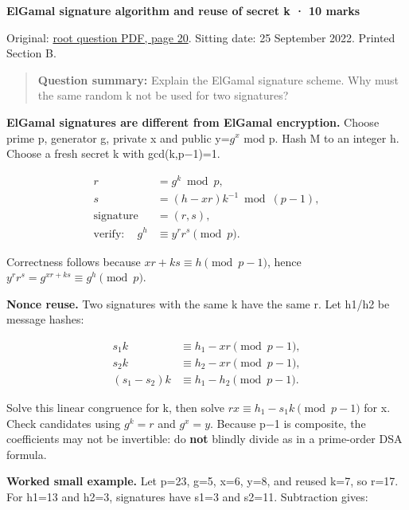 \documentclass[11pt,a4paper]{article}
\begin{document}
\textbf{ElGamal signature algorithm and reuse of secret k · 10 marks}


Original: \href{../../CSE405-Security_Merged.pdf\#page=20}{root question PDF,\allowbreak{} page 20}. Sitting date: 25 September 2022. Printed Section B.



\begin{quote}\small

\textbf{Question summary:} Explain the ElGamal signature scheme. Why must the same random k not be used for two signatures?



\end{quote}

\textbf{ElGamal signatures are different from ElGamal encryption.} Choose prime p,\allowbreak{} generator g,\allowbreak{} private x and public y=\allowbreak{}\(g^{x}\) mod p. Hash M to an integer h. Choose a fresh secret k with gcd(k,\allowbreak{}p−1)=\allowbreak{}1.



\[
\begin{aligned}r&=g^k\bmod p,\\s&=(h-xr)k^{-1}\bmod(p-1),\\\mathrm{signature}&=(r,s),\\\mathrm{verify:}\quad g^h&\equiv y^r r^s\pmod p.\end{aligned}
\]

Correctness follows because \(xr+ks\equiv h\pmod{p-1}\),\allowbreak{} hence \(y^rr^s=g^{xr+ks}\equiv g^h\pmod p\).


\textbf{Nonce reuse.} Two signatures with the same k have the same r. Let h1/\allowbreak{}h2 be message hashes:



\[
\begin{aligned}s_1k&\equiv h_1-xr\pmod{p-1},\\s_2k&\equiv h_2-xr\pmod{p-1},\\(s_1-s_2)k&\equiv h_1-h_2\pmod{p-1}.\end{aligned}
\]

Solve this linear congruence for k,\allowbreak{} then solve \(rx\equiv h_1-s_1k\pmod{p-1}\) for x. Check candidates using \(g^k=r\) and \(g^x=y\). Because p−1 is composite,\allowbreak{} the coefficients may not be invertible: do \textbf{not} blindly divide as in a prime-order DSA formula.


\textbf{Worked small example.} Let p=\allowbreak{}23,\allowbreak{} g=\allowbreak{}5,\allowbreak{} x=\allowbreak{}6,\allowbreak{} y=\allowbreak{}8,\allowbreak{} and reused k=\allowbreak{}7,\allowbreak{} so r=\allowbreak{}17. For h1=\allowbreak{}13 and h2=\allowbreak{}3,\allowbreak{} signatures have s1=\allowbreak{}3 and s2=\allowbreak{}11. Subtraction gives:
\end{document}

